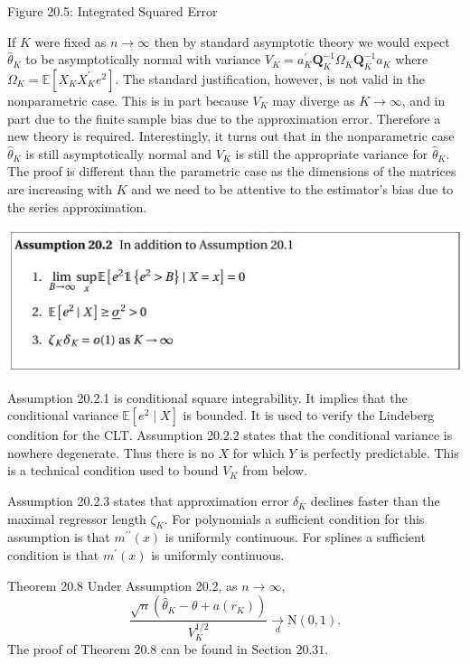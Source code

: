 \documentclass[10pt]{article}
\begin{document}
Figure 20.5: Integrated Squared Error

If $K$ were fixed as $n \rightarrow \infty$ then by standard asymptotic theory we would expect $\widehat{\theta}_{K}$ to be asymptotically normal with variance $V_{K}=a_{K}^{\prime} \boldsymbol{Q}_{K}^{-1} \Omega_{K} \boldsymbol{Q}_{K}^{-1} a_{K}$ where $\Omega_{K}=\mathbb{E}\left[X_{K} X_{K}^{\prime} e^{2}\right]$. The standard justification, however, is not valid in the nonparametric case. This is in part because $V_{K}$ may diverge as $K \rightarrow \infty$, and in part due to the finite sample bias due to the approximation error. Therefore a new theory is required. Interestingly, it turns out that in the nonparametric case $\widehat{\theta}_{K}$ is still asymptotically normal and $V_{K}$ is still the appropriate variance for $\widehat{\theta}_{K}$. The proof is different than the parametric case as the dimensions of the matrices are increasing with $K$ and we need to be attentive to the estimator's bias due to the series approximation.

\includegraphics[max width=\textwidth]{2022_10_23_2b38d6d54e7725c196e7g-16(1)}

Assumption 20.2.1 is conditional square integrability. It implies that the conditional variance $\mathbb{E}\left[e^{2} \mid X\right]$ is bounded. It is used to verify the Lindeberg condition for the CLT. Assumption 20.2.2 states that the conditional variance is nowhere degenerate. Thus there is no $X$ for which $Y$ is perfectly predictable. This is a technical condition used to bound $V_{K}$ from below.

Assumption 20.2.3 states that approximation error $\delta_{K}$ declines faster than the maximal regressor length $\zeta_{K}$. For polynomials a sufficient condition for this assumption is that $m^{\prime \prime}(x)$ is uniformly continuous. For splines a sufficient condition is that $m^{\prime}(x)$ is uniformly continuous.

Theorem 20.8 Under Assumption 20.2, as $n \rightarrow \infty$,
$$
\frac{\sqrt{n}\left(\widehat{\theta}_{K}-\theta+a\left(r_{K}\right)\right)}{V_{K}^{1 / 2}} \underset{d}{\longrightarrow} \mathrm{N}(0,1) .
$$
The proof of Theorem $20.8$ can be found in Section $20.31$.
\end{document}
